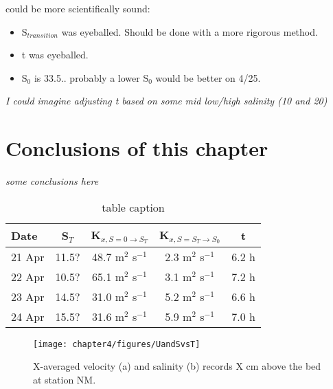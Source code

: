could be more scientifically sound:
\begin{itemize}
	\item S$_{transition}$ was eyeballed. Should be done with a more rigorous method. 
	\item t was eyeballed.
	\item S$_0$ is 33.5.. probably a lower S$_0$  would be better on 4/25. 
\end{itemize}

\emph{I could imagine adjusting t based on some mid low/high salinity (10 and 20)}

\section{Conclusions of this chapter}
\emph{some conclusions here}

\begin{table}
\renewcommand{\arraystretch}{1.3}

	\begin{center}
		\begin{tabular}{| l || c | c | c | c |}
		\hline
		Date & S$_{T}$ & K$_{x,S=0 \rightarrow S_T}$ &  K$_{x,S=S_T \rightarrow S_0}$ & t\\
		\hline \hline
		21 Apr & 11.5? & 48.7 m$^2$ s$^{-1}$ & 2.3 m$^2$ s$^{-1}$ & 6.2 h\\ 

		22 Apr & 10.5? & 65.1 m$^2$ s$^{-1}$ & 3.1 m$^2$ s$^{-1}$ & 7.2 h\\ 

		23 Apr & 14.5? & 31.0 m$^2$ s$^{-1}$ & 5.2 m$^2$ s$^{-1}$ & 6.6 h\\ 

		24 Apr & 15.5? & 31.6 m$^2$ s$^{-1}$ & 5.9 m$^2$ s$^{-1}$ & 7.0 h\\  \hline 
	\end{tabular}
	\caption{table caption}\label{tab:Kxtable}
\end{center}
\end{table}






\begin{figure}
	\texttt{[image: chapter4/figures/UandSvsT]} 
\caption{X-averaged velocity (a) and salinity (b) records X cm above the bed at station NM.} \label{fig:UandSvsTch4}
\end{figure}

